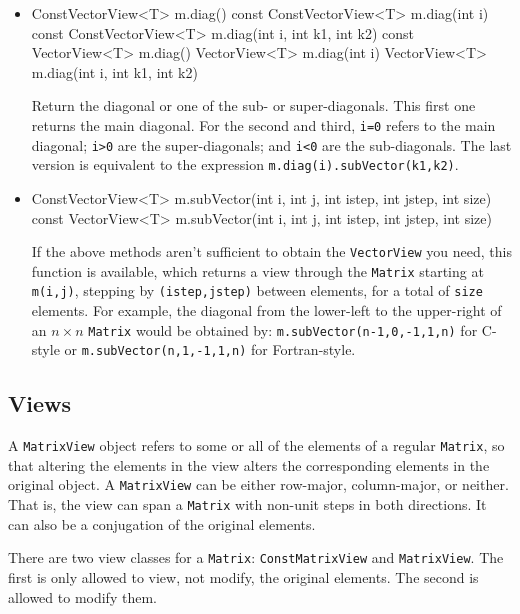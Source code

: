 \documentclass[twoside,letterpaper,11pt]{article}
\renewcommand{\tt}[1]{{\lstinline {#1}}}
\begin{document}
\begin{itemize}
\item
\begin{tmvcode}
ConstVectorView<T> m.diag() const
ConstVectorView<T> m.diag(int i) const 
ConstVectorView<T> m.diag(int i, int k1, int k2) const
VectorView<T> m.diag()
VectorView<T> m.diag(int i)
VectorView<T> m.diag(int i, int k1, int k2)
\end{tmvcode}
Return the diagonal or one of the sub- or super-diagonals.
This first one returns the main diagonal.  For the second and third,
\tt{i=0} refers to the main diagonal; \tt{i>0} are the super-diagonals;
and \tt{i<0} are the sub-diagonals.  The last version is equivalent to the
expression 
\tt{m.diag(i).subVector(k1,k2)}.
\item
\begin{tmvcode}
ConstVectorView<T> m.subVector(int i, int j, int istep, int jstep, 
      int size) const
VectorView<T> m.subVector(int i, int j, int istep, int jstep, int size) 
\end{tmvcode}
If the above methods aren't sufficient to obtain the \tt{VectorView} you
need, this function is available, which returns a view through the \tt{Matrix} 
starting at \tt{m(i,j)}, stepping by \tt{(istep,jstep)} between elements,
for a total of \tt{size} elements.  For example, the diagonal
from the lower-left to the upper-right of an $n \times n$ \tt{Matrix} 
would be obtained by: \tt{m.subVector(n-1,0,-1,1,n)} for C-style or
\tt{m.subVector(n,1,-1,1,n)} for Fortran-style.

\end{itemize}


\subsection{Views}
\label{MViews}

A \tt{MatrixView} object refers to some or all of the elements of a regular \tt{Matrix},
so that altering the elements in the view alters the
corresponding elements in the original object.  A \tt{MatrixView}
can be either row-major, column-major, or neither.  That is, the view can 
span a \tt{Matrix} with non-unit steps in both directions.
It can also be a conjugation of the original
elements.

There are two view classes for
a \tt{Matrix}:
\tt{ConstMatrixView} and \tt{MatrixView}.  
The first is only allowed to view,
not modify, the original elements.  The second is allowed to modify them.
\end{document}
